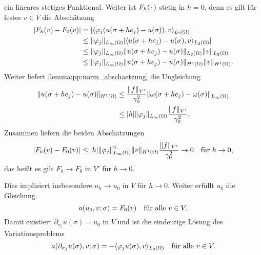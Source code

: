 \begin{Satz}
\begin{Beweis}
\begin{equation}
        \end{equation}
        ein lineares stetiges Funktional.
        Weiter ist $F_{h}(\blank)$ stetig in $h = 0$, denn es gilt für festes $v \in V$ die Abschätzung
        \begin{align}
            \abs{F_{h}(v) - F_{0}(v)}
            &= \abs{\skp{\varphi_{j} (u(\sigma + h e_{j}) - u(\sigma))}{v}{L_{2}(\Omega)}}
            \\&\leq \norm{\varphi_{j}}_{L_{\infty}(\Omega)} \abs{\skp{u(\sigma + h e_{j}) - u(\sigma)}{v}{L_{2}(\Omega)}}
            \\&\leq \norm{\varphi_{j}}_{L_{\infty}(\Omega)} \norm{u(\sigma + h e_{j}) - u(\sigma)}_{L_{2}(\Omega)} \norm{v}_{L_{2}(\Omega)}
            \\&\leq \norm{\varphi_{j}}_{L_{\infty}(\Omega)} \norm{u(\sigma + h e_{j}) - u(\sigma)}_{H^{1}(\Omega)} \norm{v}_{H^{1}(\Omega)}.
        \end{align}
        Weiter liefert \cref{lemma:pp:norm_abschaetzung} die Ungleichung
        \begin{align}
            \norm{u(\sigma + h e_{j}) - u(\sigma)}_{H^{1}(\Omega)}
            &\leq \frac{\norm{f}_{V'}}{\gamma_{0}^{2}} \norm{\omega(\sigma + h e_{j}) - \omega(\sigma)}_{L_{\infty}(\Omega)}
            \\&\leq \abs{h} \norm{\varphi_{j}}_{L_{\infty}(\Omega)} \frac{\norm{f}_{V'}}{\gamma_{0}^{2}}.
        \end{align}
        Zusammen liefern die beiden Abschätzungen
        \begin{equation}
            \abs{F_{h}(v) - F_{0}(v)} \leq \abs{h} \norm{\varphi_{j}}^{2}_{L_{\infty}(\Omega)} \norm{v}_{H^{1}(\Omega)} \frac{\norm{f}_{V'}}{\gamma_{0}^{2}} \to 0 \quad \text{für}~h \to 0,
        \end{equation}
        das heißt es gilt $F_{h} \to F_{0}$ in $V'$ für $h \to 0$.

        Dies impliziert insbesondere $u_{h} \to u_{0}$ in $V$ für $h \to 0$.
        Weiter erfüllt $u_{0}$ die Gleichung
        \begin{equation}
            a(u_{0}, v; \sigma) = F_{0}(v) \quad \fa v \in V.
        \end{equation}
        Damit existiert $\partial_{\sigma_{j}} u(\sigma) = u_{0}$ in $V$ und ist die eindeutige Lösung des Variationsproblems
        \begin{equation}
            a(\partial_{\sigma_{j}} u(\sigma), v; \sigma) = - \skp{\varphi_{j} u(\sigma)}{v}{L_{2}(\Omega)} \quad \fa v \in V.
        \end{equation}


\end{Beweis}
\end{Satz}
